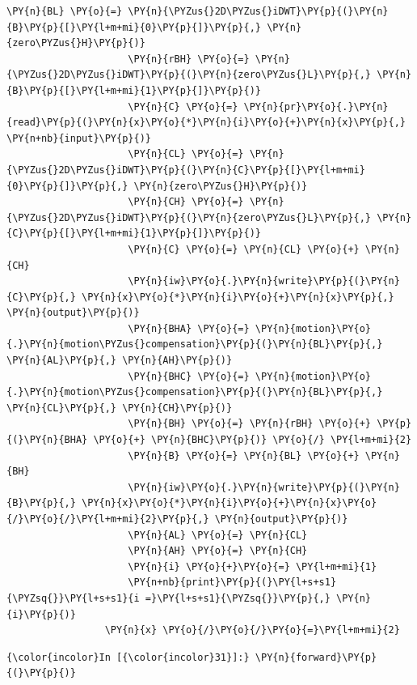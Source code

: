 \begin{Verbatim}[commandchars=\\\{\}]
                     \PY{n}{BL} \PY{o}{=} \PY{n}{\PYZus{}2D\PYZus{}iDWT}\PY{p}{(}\PY{n}{B}\PY{p}{[}\PY{l+m+mi}{0}\PY{p}{]}\PY{p}{,} \PY{n}{zero\PYZus{}H}\PY{p}{)}
                     \PY{n}{rBH} \PY{o}{=} \PY{n}{\PYZus{}2D\PYZus{}iDWT}\PY{p}{(}\PY{n}{zero\PYZus{}L}\PY{p}{,} \PY{n}{B}\PY{p}{[}\PY{l+m+mi}{1}\PY{p}{]}\PY{p}{)}
                     \PY{n}{C} \PY{o}{=} \PY{n}{pr}\PY{o}{.}\PY{n}{read}\PY{p}{(}\PY{n}{x}\PY{o}{*}\PY{n}{i}\PY{o}{+}\PY{n}{x}\PY{p}{,} \PY{n+nb}{input}\PY{p}{)}
                     \PY{n}{CL} \PY{o}{=} \PY{n}{\PYZus{}2D\PYZus{}iDWT}\PY{p}{(}\PY{n}{C}\PY{p}{[}\PY{l+m+mi}{0}\PY{p}{]}\PY{p}{,} \PY{n}{zero\PYZus{}H}\PY{p}{)}
                     \PY{n}{CH} \PY{o}{=} \PY{n}{\PYZus{}2D\PYZus{}iDWT}\PY{p}{(}\PY{n}{zero\PYZus{}L}\PY{p}{,} \PY{n}{C}\PY{p}{[}\PY{l+m+mi}{1}\PY{p}{]}\PY{p}{)}
                     \PY{n}{C} \PY{o}{=} \PY{n}{CL} \PY{o}{+} \PY{n}{CH}
                     \PY{n}{iw}\PY{o}{.}\PY{n}{write}\PY{p}{(}\PY{n}{C}\PY{p}{,} \PY{n}{x}\PY{o}{*}\PY{n}{i}\PY{o}{+}\PY{n}{x}\PY{p}{,} \PY{n}{output}\PY{p}{)}
                     \PY{n}{BHA} \PY{o}{=} \PY{n}{motion}\PY{o}{.}\PY{n}{motion\PYZus{}compensation}\PY{p}{(}\PY{n}{BL}\PY{p}{,} \PY{n}{AL}\PY{p}{,} \PY{n}{AH}\PY{p}{)}
                     \PY{n}{BHC} \PY{o}{=} \PY{n}{motion}\PY{o}{.}\PY{n}{motion\PYZus{}compensation}\PY{p}{(}\PY{n}{BL}\PY{p}{,} \PY{n}{CL}\PY{p}{,} \PY{n}{CH}\PY{p}{)}
                     \PY{n}{BH} \PY{o}{=} \PY{n}{rBH} \PY{o}{+} \PY{p}{(}\PY{n}{BHA} \PY{o}{+} \PY{n}{BHC}\PY{p}{)} \PY{o}{/} \PY{l+m+mi}{2}
                     \PY{n}{B} \PY{o}{=} \PY{n}{BL} \PY{o}{+} \PY{n}{BH}
                     \PY{n}{iw}\PY{o}{.}\PY{n}{write}\PY{p}{(}\PY{n}{B}\PY{p}{,} \PY{n}{x}\PY{o}{*}\PY{n}{i}\PY{o}{+}\PY{n}{x}\PY{o}{/}\PY{o}{/}\PY{l+m+mi}{2}\PY{p}{,} \PY{n}{output}\PY{p}{)}
                     \PY{n}{AL} \PY{o}{=} \PY{n}{CL}
                     \PY{n}{AH} \PY{o}{=} \PY{n}{CH}
                     \PY{n}{i} \PY{o}{+}\PY{o}{=} \PY{l+m+mi}{1}
                     \PY{n+nb}{print}\PY{p}{(}\PY{l+s+s1}{\PYZsq{}}\PY{l+s+s1}{i =}\PY{l+s+s1}{\PYZsq{}}\PY{p}{,} \PY{n}{i}\PY{p}{)}
                 \PY{n}{x} \PY{o}{/}\PY{o}{/}\PY{o}{=}\PY{l+m+mi}{2}
\end{Verbatim}


    \begin{Verbatim}[commandchars=\\\{\}]
{\color{incolor}In [{\color{incolor}31}]:} \PY{n}{forward}\PY{p}{(}\PY{p}{)}
\end{Verbatim}


